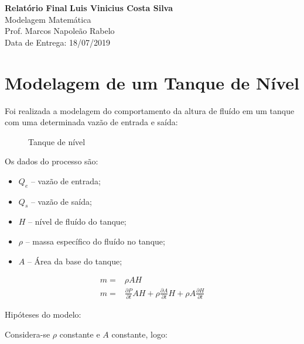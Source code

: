 \documentclass[fleqn, 11pt]{article}
\begin{document}
\noindent
\large\textbf{Relatório Final} \hfill \textbf{Luis Vinicius Costa Silva} \\
\normalsize Modelagem Matemática \\
Prof. Marcos Napoleão Rabelo \\
\hfill Data de Entrega: 18/07/2019
\tableofcontents
\newpage

\section{Modelagem de um Tanque de Nível}
Foi realizada a modelagem do comportamento da altura de fluído em um tanque com uma determinada vazão de entrada e saída: 

\begin{figure}[H]
\label{figure:tanque}
   \caption{Tanque de nível}
\end{figure}

Os dados do processo são:

\begin{itemize}
\item $Q_e $ --  vazão de entrada;
\item $Q_s$  -- vazão de saída;
\item $H$    -- nível de fluído do tanque;
\item $\rho$ -- massa específico do fluído no tanque;
\item $A$    -- Área da base do tanque;
\end{itemize}

\begin{align*}
m = & \rho A H \\
m = & \frac{\partial P}{\partial t} A H + \rho \frac{\partial A}{\partial t} H + \rho A \frac{\partial H}{\partial t}
\end{align*}

Hipóteses do modelo:

Considera-se $\rho$ constante e $A$ constante, logo:
\end{document}
